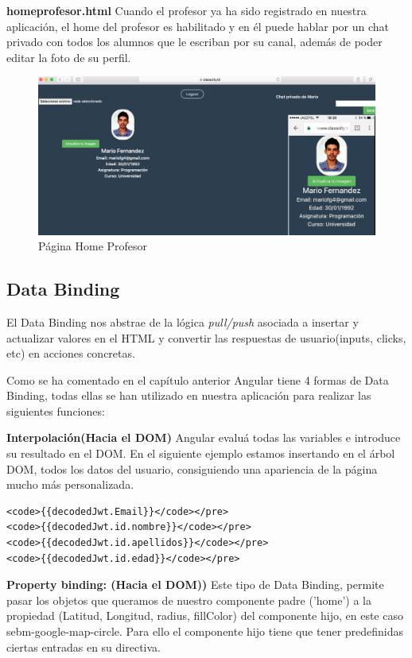 \textbf{homeprofesor.html} Cuando el profesor ya ha sido registrado en nuestra aplicación, el home del profesor es habilitado y en él puede hablar por un chat privado con todos los alumnos que le escriban por su canal, además de poder editar la foto de su perfil.
\begin{figure}[!h]
    \centering
    \includegraphics[width=160mm]{img/templates/homeprof.png}
    \caption{Página Home Profesor}
    \label{img:homeprofesorclasscity}
\end{figure}

\subsection{Data Binding} El Data Binding nos abstrae de la lógica \textit{pull/push} asociada a insertar y actualizar valores en el HTML y convertir las respuestas de usuario(inputs, clicks, etc) en acciones concretas.

Como se ha comentado en el capítulo anterior Angular tiene 4 formas de Data Binding, todas ellas se han utilizado en nuestra aplicación para realizar las siguientes funciones:

\textbf{Interpolación(Hacia el DOM)} Angular evaluá todas las variables e introduce su resultado en el DOM. En el siguiente ejemplo estamos insertando en el árbol DOM, todos los datos del usuario, consiguiendo una apariencia de la página mucho más personalizada.

\begin{lstlisting}
<code>{{decodedJwt.Email}}</code></pre>
<code>{{decodedJwt.id.nombre}}</code></pre>
<code>{{decodedJwt.id.apellidos}}</code></pre>
<code>{{decodedJwt.id.edad}}</code></pre>
\end{lstlisting}

\textbf{Property binding: (Hacia el DOM))} Este tipo de Data Binding, permite pasar los objetos que queramos de nuestro componente padre ('home') a la propiedad (Latitud, Longitud, radius, fillColor) del componente hijo, en este caso sebm-google-map-circle. Para ello el componente hijo tiene que tener predefinidas ciertas entradas en su directiva.

